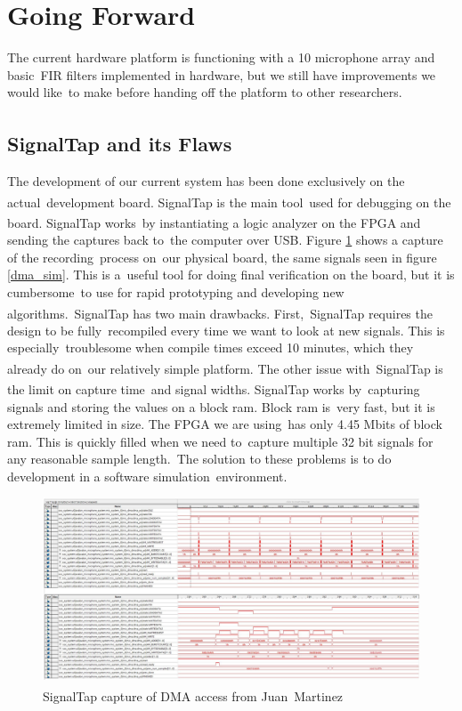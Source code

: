 \documentclass{article}
\begin{document}
\section{Going Forward}
The current hardware platform is functioning with a 10 microphone array and basic\
FIR filters implemented in hardware, but we still have improvements we would like\
to make before handing off the platform to other researchers.

\subsection{SignalTap\textsuperscript{\textregistered{}} and its Flaws}
The development of our current system has been done exclusively on the actual\
development board. SignalTap\textsuperscript{\textregistered{}} is the main tool\
used for debugging on the board. SignalTap\textsuperscript{\textregistered{}} works\
by instantiating a logic analyzer on the FPGA and sending the captures back to\
the computer over USB. Figure \ref{signaltap} shows a capture of the recording\
process on\
our physical board, the same signals seen in figure \ref{dma_sim}. This is a\
useful tool for doing final verification on the board, but it is cumbersome\
to use for rapid prototyping and developing new algorithms.\
SignalTap\textsuperscript{\textregistered{}} has two main drawbacks. First,\
SignalTap\textsuperscript{\textregistered{}} requires the design to be fully\
recompiled every time we want to look at new signals.  This is especially\
troublesome when compile times exceed 10 minutes, which they already do on\
our relatively simple platform. The other issue with\
SignalTap\textsuperscript{\textregistered{}} is the limit on capture time\
and signal widths. SignalTap\textsuperscript{\textregistered{}} works by\
capturing signals and storing the values on a block ram. Block ram is\
very fast, but it is extremely limited in size. The FPGA we are using\
has only 4.45 Mbits of block ram. This is quickly filled when we need to\
capture multiple 32 bit signals for any reasonable sample length.\
The solution to these problems is to do development in a software simulation\ 
environment.

\begin{figure}[ht]
	\begin{center}
	\includegraphics[scale=.28]{pictures/signaltap.png}
	\caption{SignalTap\textsuperscript{\textregistered} capture of DMA access from Juan\
	Martinez}
	\label{signaltap}
	\end{center}
\end{figure}
\end{document}
